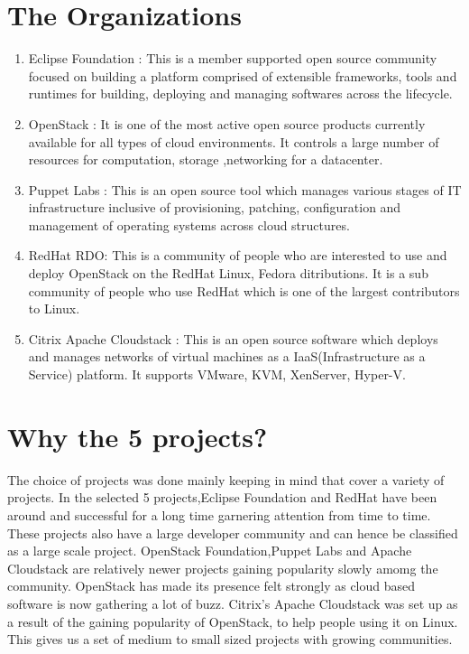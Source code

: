 \documentclass[seploa]{beavtex}
\begin{document}
\section{The Organizations}
\begin{enumerate}
\item Eclipse Foundation :
This is a member supported open source community focused on building a platform comprised of extensible frameworks, tools and runtimes for building, deploying and managing softwares across the lifecycle\cite{eclipse}.
\item OpenStack :
It is one of the most active open source products currently available for all types of cloud environments. It controls a large number of resources for computation, storage ,networking for a datacenter\cite{openstack}.
\item Puppet Labs :
This is an open source tool which manages various stages of IT infrastructure inclusive of provisioning, patching, configuration and management of operating systems across cloud structures\cite{puppet}.
\item RedHat RDO:
This is a community of people who are interested to use and deploy OpenStack on the RedHat Linux, Fedora ditributions. It is a sub community of people who use RedHat which is one of the largest contributors to Linux\cite{rdo}.
\item Citrix Apache Cloudstack :
This is an open source software which deploys and manages networks of virtual machines as a IaaS(Infrastructure as a Service) platform. It supports VMware, KVM, XenServer, Hyper-V\cite{apache}.
\end{enumerate}

\section{Why the 5 projects?}
The choice of projects was done mainly keeping in mind that cover a variety of projects. In the selected 5 projects,Eclipse Foundation and RedHat have been around and successful for a long time garnering attention from time to time. These projects also have a large developer community and can hence be classified as a large scale project. OpenStack Foundation,Puppet Labs and Apache Cloudstack are relatively newer projects gaining popularity slowly amomg the community. OpenStack has made its presence felt strongly as cloud based software is now gathering a lot of buzz. Citrix's Apache Cloudstack was set up as a result of the gaining popularity of OpenStack, to help people using it on Linux. This gives us a set of medium to small sized projects with growing communities.
\end{document}
